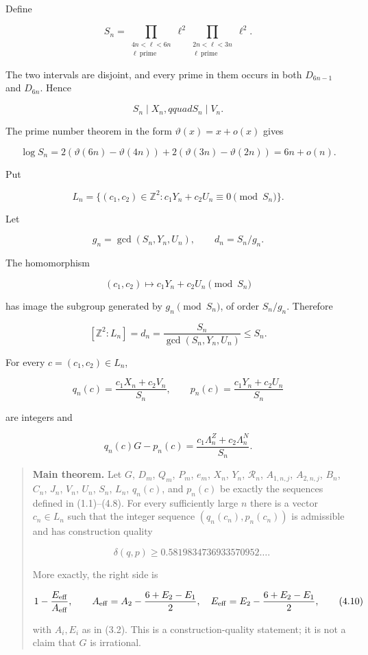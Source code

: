 \documentclass[
  11pt,
]{article}
\begin{document}
Define

\[
 S_n=\prod_{\substack{4n<\ell<6n\\ \ell\ \mathrm{prime}}}\ell^2
     \prod_{\substack{2n<\ell<3n\\ \ell\ \mathrm{prime}}}\ell^2.
 \tag{4.1}
\]

The two intervals are disjoint, and every prime in them occurs in both
\(D_{6n-1}\) and \(D_{6n}\). Hence

\[
 S_n\mid X_n,qquad S_n\mid V_n.
 \tag{4.2}
\]

The prime number theorem in the form \(\vartheta(x)=x+o(x)\) gives

\[
 \log S_n
 =2(\vartheta(6n)-\vartheta(4n))
  +2(\vartheta(3n)-\vartheta(2n))=6n+o(n).
 \tag{4.3}
\]

Put

\[
 L_n=\{(c_1,c_2)\in\mathbb Z^2:
        c_1Y_n+c_2U_n\equiv0\pmod{S_n}\}.
 \tag{4.4}
\]

Let

\[
 g_n=\gcd(S_n,Y_n,U_n),\qquad d_n=S_n/g_n.
 \tag{4.5}
\]

The homomorphism

\[
 (c_1,c_2)\longmapsto c_1Y_n+c_2U_n\pmod{S_n}
\]

has image the subgroup generated by \(g_n\pmod {S_n}\), of order
\(S_n/g_n\). Therefore

\[
 [\mathbb Z^2:L_n]=d_n=\frac{S_n}{\gcd(S_n,Y_n,U_n)}\le S_n.
 \tag{4.6}
\]

For every \(c=(c_1,c_2)\in L_n\),

\[
 q_n(c)=\frac{c_1X_n+c_2V_n}{S_n},\qquad
 p_n(c)=\frac{c_1Y_n+c_2U_n}{S_n}
 \tag{4.7}
\]

are integers and

\[
 q_n(c)G-p_n(c)=
 \frac{c_1\Lambda_n^Z+c_2\Lambda_n^N}{S_n}.
 \tag{4.8}
\]

\begin{quote}
\textbf{Main theorem.} Let \(G\), \(D_m\), \(Q_m\), \(P_m\), \(e_m\),
\(X_n\), \(Y_n\), \(\mathcal R_n\), \(A_{1,n,j}\), \(A_{2,n,j}\),
\(B_n\), \(C_n\), \(J_n\), \(V_n\), \(U_n\), \(S_n\), \(L_n\),
\(q_n(c)\), and \(p_n(c)\) be exactly the sequences defined in
(1.1)--(4.8). For every sufficiently large \(n\) there is a vector
\(c_n\in L_n\) such that the integer sequence \((q_n(c_n),p_n(c_n))\) is
admissible and has construction quality

\[
\delta(q,p)\ge0.5819834736933570952\ldots .          \tag{4.9}
\]

More exactly, the right side is

\[
1-\frac{E_{\rm eff}}{A_{\rm eff}},\qquad
A_{\rm eff}=A_2-\frac{6+E_2-E_1}{2},\quad
E_{\rm eff}=E_2-\frac{6+E_2-E_1}{2},               \tag{4.10}
\]

with \(A_i,E_i\) as in (3.2). This is a construction-quality statement;
it is not a claim that \(G\) is irrational.
\end{quote}
\end{document}
